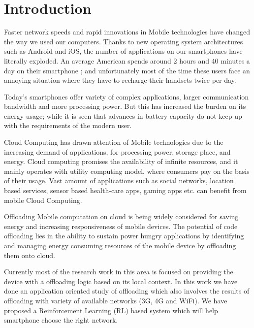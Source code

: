 \documentclass{report}
\begin{document}
\chapter{Introduction} %
\label{chap:Introduction}

Faster network speeds and rapid innovations in Mobile technologies have changed the way we used our computers. Thanks to new operating system architectures such as Android and iOS, the number of applications on our smartphones have literally exploded. An average American spends around 2 hours and 40 minutes a day on their smartphone \cite{averageAmerican}; and unfortunately most of the time these users face an annoying situation where they have to recharge their handsets twice per day. 
  
Today's smartphones offer variety of complex applications, larger communication bandwidth and more processing power. But this has increased the burden on its energy usage; while it is seen that advances in battery capacity do not keep up with the requirements of the modern user.

Cloud Computing has drawn attention of Mobile technologies due to the increasing demand of applications, for processing power, storage place, and energy. Cloud computing promises the availability of infinite resources, and it mainly operates with utility computing model, where consumers pay on the basis of their usage. Vast amount of applications such as social networks, location based services, sensor based health-care apps, gaming apps etc. can benefit from mobile Cloud Computing.

Offloading Mobile computation on cloud is being widely considered for saving energy and increasing responsiveness of mobile devices.
The potential of code offloading lies in the ability to sustain power hungry applications by identifying and managing energy consuming resources of the mobile device by offloading them onto cloud. 

Currently most of the research work in this area is focused on providing the device with a offloading logic based on its local context. In this work we have done an application oriented study of offloading which also involves the results of offloading with variety of available networks (3G, 4G and WiFi). We have proposed a Reinforcement Learning (RL) based system which will help smartphone choose the right network. 
\end{document}
